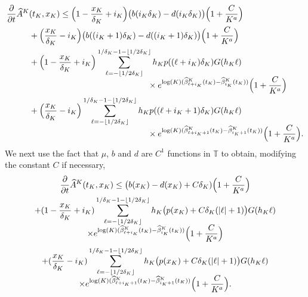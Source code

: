 \documentclass[JEP,XML,SOM,Unicode,published]{cedram}
\let\f\frac
\theoremstyle{plain}
\theoremstyle{remark}
\newcommand\T{\mathbb{T}}
\begin{document}
\begin{align*}
\frac{\partial}{\partial t} \widehat A^K&(t_K,x_K) \leq \Bigl(1-\f {x_K}{\delta_K}+i_K\Bigr) \big(b(i_K\delta_K) -d(i_K\delta_K)\big)\Bigl(1+\frac{C}{K^a}\Bigr)\\
&+\Bigl(\f {x_K}{\delta_K}-i_K\Bigr)\big(b((i_K+1)\delta_K) -d((i_K+1)\delta_K)\big)\Bigl(1+\frac{C}{K^a}\Bigr)\\
&+ \Bigl(1-\f {x_K}{\delta_K}+i_K\Bigr) \sum_{\ell=-\lfloor 1/2\delta_K\rfloor}^{1/\delta_K-1-\lfloor 1/2\delta_K\rfloor}h_Kp((\ell+i_K)\delta_K)G(h_K\ell) \\[-5pt]
& \hspace{5cm} \times e^{\log(K)(\widehat \beta_{\ell+i_K}^K(t_K)-\widehat\beta_{i_K}^K(t_K))}
\Bigl(1+\frac{C}{K^a}\Bigr)
\notag\\
&+ \Bigl(\f {x_K}{\delta_K}-i_K\Bigr) \sum_{\ell=-\lfloor 1/2\delta_K\rfloor}^{1/\delta_K-1-\lfloor 1/2\delta_K\rfloor}h_Kp((\ell+i_K+1)\delta_K)G(h_K\ell)\\[-5pt]
& \hspace{5cm} \times e^{\log(K)(\widehat \beta_{\ell+i_K+1}^K(t_K)-\widehat \beta_{i_K+1}^K(t_K))} \Bigl(1+\frac{C}{K^a}\Bigr).
\end{align*}
We next use the fact that $\mu$, $b$ and $d$ are $C^1$ functions in $\T$ to obtain, modifying the constant $C$ if necessary,\vspace*{-5pt}
\begin{multline}\label{eq:calcul-penible}
\frac{\partial}{\partial t} \widehat A^K(t_K,x_K) \leq \big(b(x_K)-d(x_K)+C\delta_K)\Bigl(1+\frac{C}{K^a}\Bigr)\\
+(1-\f {x_K}{\delta_K}+i_K) \sum_{\ell=-\lfloor 1/2\delta_K\rfloor}^{1/\delta_K-1-\lfloor 1/2\delta_K\rfloor}h_K \bigl(p(x_K)+C\delta_K(|\ell|+1)\bigr) G(h_K\ell)  \\[-5pt]
 \times e^{\log(K)(\widehat \beta_{\ell+i_K}^K(t_K)-\widehat \beta_{i_K}^K(t_K))} \Bigl(1+\frac{C}{K^a}\Bigr)
\end{multline}
\vspace*{-1.2\baselineskip}
\begin{multline*}
+ (\f {x_K}{\delta_K}-i_K) \sum_{\ell=-\lfloor 1/2\delta_K\rfloor}^{1/\delta_K-1-\lfloor 1/2\delta_K\rfloor}h_K \bigl(p(x_K)+C\delta_K(|\ell|+1)\bigr) G(h_K\ell) \\[-5pt]
\times e^{\log(K)(\widehat \beta_{\ell+i_K+1}^K(t_K)-\widehat\beta_{i_K+1}^K(t_K))} \Bigl(1+\frac{C}{K^a}\Bigr).
\end{multline*}
\end{document}
